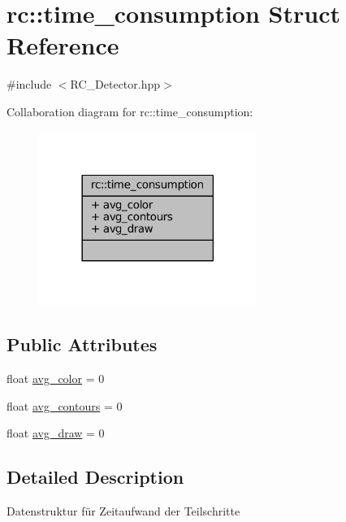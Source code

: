 \hypertarget{structrc_1_1time__consumption}{\section{rc\+:\+:time\+\_\+consumption Struct Reference}
\label{structrc_1_1time__consumption}
}


{\ttfamily \#include $<$R\+C\+\_\+\+Detector.\+hpp$>$}



Collaboration diagram for rc\+:\+:time\+\_\+consumption\+:\nopagebreak
\begin{figure}[H]
\begin{center}
\leavevmode
\includegraphics[width=201pt]{structrc_1_1time__consumption__coll__graph}
\end{center}
\end{figure}
\subsection*{Public Attributes}
\begin{DoxyCompactItemize}
\item 
float \hyperlink{structrc_1_1time__consumption_af6c0bde60b738f03712474c1806cc220}{avg\+\_\+color} = 0
\item 
float \hyperlink{structrc_1_1time__consumption_a0489745a27d37811eb1e92b42b3c4177}{avg\+\_\+contours} = 0
\item 
float \hyperlink{structrc_1_1time__consumption_afd38ef6d81f21860ab5c1a219f0e2bc5}{avg\+\_\+draw} = 0
\end{DoxyCompactItemize}


\subsection{Detailed Description}
Datenstruktur für Zeitaufwand der Teilschritte 

